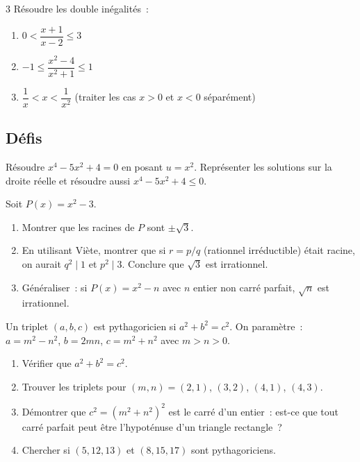 \begin{probleme}{3}
R\'esoudre les double in\'egalit\'es~:
\begin{enumerate}
  \item $0 < \dfrac{x+1}{x-2} \leq 3$
  \item $-1 \leq \dfrac{x^2-4}{x^2+1} \leq 1$
  \item $\dfrac{1}{x} < x < \dfrac{1}{x^2}$
        \quad(traiter les cas $x>0$ et $x<0$ s\'epar\'ement)
\end{enumerate}
\end{probleme}

\subsection*{D\'efis}

\begin{challenge}
R\'esoudre $x^4 - 5x^2 + 4 = 0$ en posant $u = x^2$.
Repr\'esenter les solutions sur la droite r\'eelle
et r\'esoudre aussi $x^4 - 5x^2 + 4 \leq 0$.
\end{challenge}

\begin{challenge}
Soit $P(x) = x^2 - 3$.
\begin{enumerate}
  \item Montrer que les racines de $P$ sont $\pm\sqrt{3}$.
  \item En utilisant Vi\`ete, montrer que si $r = p/q$ (rationnel irr\'eductible)
        \'etait racine, on aurait $q^2 \mid 1$ et $p^2 \mid 3$.
        Conclure que $\sqrt{3}$ est irrationnel.
  \item G\'en\'eraliser~: si $P(x) = x^2 - n$ avec $n$ entier non carr\'e parfait,
        $\sqrt{n}$ est irrationnel.
\end{enumerate}
\end{challenge}

\begin{challenge}
Un triplet $(a,b,c)$ est pythagoricien si $a^2+b^2=c^2$.
On param\`etre~: $a = m^2-n^2$, $b = 2mn$, $c = m^2+n^2$ avec $m > n > 0$.
\begin{enumerate}
  \item V\'erifier que $a^2+b^2=c^2$.
  \item Trouver les triplets pour $(m,n)=(2,1)$, $(3,2)$, $(4,1)$, $(4,3)$.
  \item D\'emontrer que $c^2 = (m^2+n^2)^2$ est le carr\'e d'un entier~: est-ce
        que tout carr\'e parfait peut \^etre l'hypot\'enuse d'un triangle rectangle~?
  \item Chercher si $(5,12,13)$ et $(8,15,17)$ sont pythagoriciens.
\end{enumerate}
\end{challenge}

